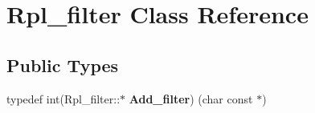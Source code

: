 \hypertarget{classRpl__filter}{}\section{Rpl\+\_\+filter Class Reference}
\label{classRpl__filter}
\subsection*{Public Types}
\begin{DoxyCompactItemize}
\item 
\mbox{\label{classRpl__filter_a7b284a235400e0151575c4059c0543b2}} 
typedef int(Rpl\+\_\+filter\+::$\ast$ {\bfseries Add\+\_\+filter}) (char const $\ast$)
\end{DoxyCompactItemize}

